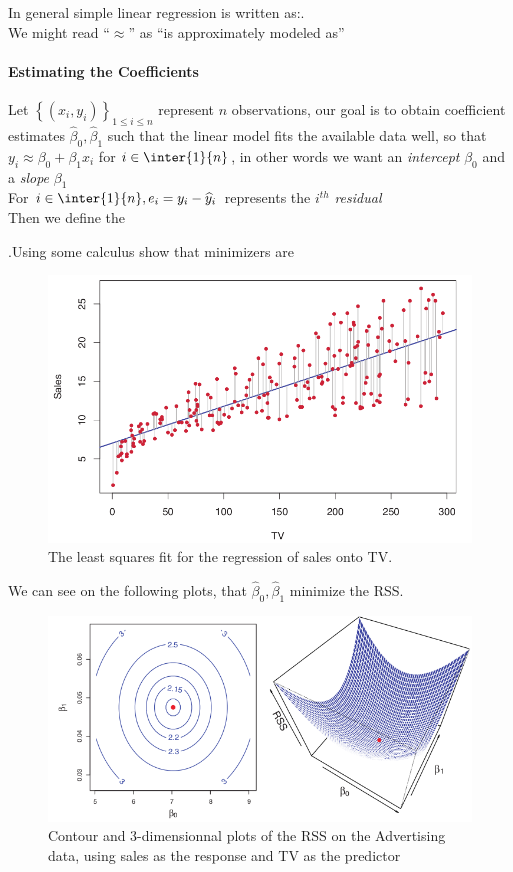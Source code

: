 In general simple linear regression is written as:.\\We might read ``$\approx$'' as ``is 
approximately modeled as''

\paragraph{Estimating the Coefficients}
Let $\left\{ \left( x_{i},y_{i} \right) \right\}_{1\leq i\leq n}$
represent $n$ observations, our goal is to obtain coefficient estimates
$\widehat{\beta}_{0},\widehat{\beta}_{1}$ such that the linear model
fits the available data well, so that $y_{i}\approx\beta_{0}+\beta_{1}
x_{i}$ for $i\in\inter{1}{n}$, in other words we want an \emph{
intercept} $\beta_{0}$ and a \emph{slope} $\beta_{1}$\\For $i\in\inter{1
}{n}, e_{i}=y_{i}-\widehat{y}_{i}$ represents the $i^{th}$ \emph{
residual}\\
Then we define the \begin{center}\end{center}.Using some calculus show 
that minimizers are 
\begin{figure}[H]
  \centering
  \includegraphics[width=.3\textwidth]{./chap/1chap/2sec/1images/1_leastSquares.png}
  \caption{The least squares fit for the regression of sales onto TV.}
  \label{fig:2.1}
\end{figure}
We can see on the following plots, that $\widehat{\beta}_{0},\widehat{\beta}_{1}$ minimize the RSS.
\begin{figure}[H]
  \centering
  \includegraphics[width=.5\textwidth]{./chap/1chap/2sec/1images/2_leastSquaresCoefficients.png}
  \caption{Contour and 3-dimensionnal plots of the RSS on the 
Advertising data, using sales as the response and TV as the predictor}
  \label{fig:2.2}
\end{figure}

